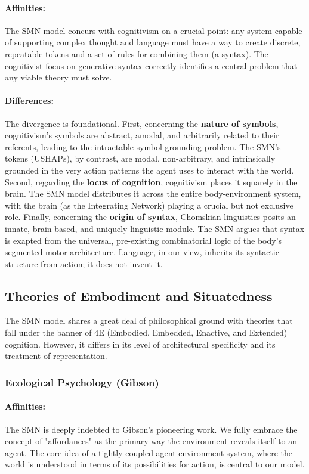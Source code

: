 \paragraph{Affinities:} The SMN model concurs with cognitivism on a crucial point: any system capable of supporting complex thought and language must have a way to create discrete, repeatable tokens and a set of rules for combining them (a syntax). The cognitivist focus on generative syntax correctly identifies a central problem that any viable theory must solve.

\paragraph{Differences:} The divergence is foundational. First, concerning the \textbf{nature of symbols}, cognitivism's symbols are abstract, amodal, and arbitrarily related to their referents, leading to the intractable symbol grounding problem. The SMN's tokens (USHAPs), by contrast, are modal, non-arbitrary, and intrinsically grounded in the very action patterns the agent uses to interact with the world. Second, regarding the \textbf{locus of cognition}, cognitivism places it squarely in the brain. The SMN model distributes it across the entire body-environment system, with the brain (as the Integrating Network) playing a crucial but not exclusive role. Finally, concerning the \textbf{origin of syntax}, Chomskian linguistics posits an innate, brain-based, and uniquely linguistic module. The SMN argues that syntax is exapted from the universal, pre-existing combinatorial logic of the body's segmented motor architecture. Language, in our view, inherits its syntactic structure from action; it does not invent it.
\subsection{Theories of Embodiment and Situatedness}\label{subsec:comparison_embodiment}
The SMN model shares a great deal of philosophical ground with theories that fall under the banner of 4E (Embodied, Embedded, Enactive, and Extended) cognition. However, it differs in its level of architectural specificity and its treatment of representation.  \subsubsection{Ecological Psychology (Gibson)}\label{ssubsec:ecological}\paragraph{Affinities:} The SMN is deeply indebted to Gibson's pioneering work. We fully embrace the concept of "affordances" as the primary way the environment reveals itself to an agent. The core idea of a tightly coupled agent-environment system, where the world is understood in terms of its possibilities for action, is central to our model.
